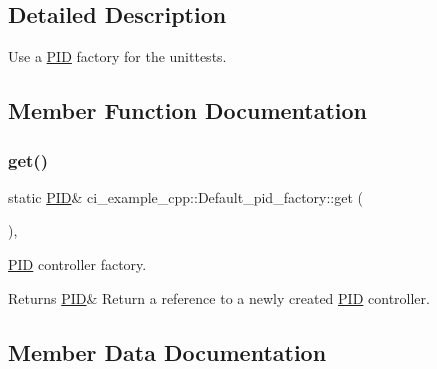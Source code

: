 \subsection{Detailed Description}
Use a \hyperlink{classci__example__cpp_1_1PID}{P\+ID} factory for the unittests. 



\subsection{Member Function Documentation}
\mbox{\label{classci__example__cpp_1_1Default__pid__factory_a5dbbcfbe3e19953b9d0c490ea62fde1a}} 
\subsubsection{\texorpdfstring{get()}{get()}}
{\footnotesize\ttfamily static \hyperlink{classci__example__cpp_1_1PID}{P\+ID}\& ci\+\_\+example\+\_\+cpp\+::\+Default\+\_\+pid\+\_\+factory\+::get (\begin{DoxyParamCaption}{ }\end{DoxyParamCaption})\hspace{0.3cm}{\ttfamily [inline]}, {\ttfamily [static]}}



\hyperlink{classci__example__cpp_1_1PID}{P\+ID} controller factory. 

\begin{DoxyReturn}{Returns}
\hyperlink{classci__example__cpp_1_1PID}{P\+ID}\& Return a reference to a newly created \hyperlink{classci__example__cpp_1_1PID}{P\+ID} controller. 
\end{DoxyReturn}


\subsection{Member Data Documentation}
\mbox{\label{classci__example__cpp_1_1Default__pid__factory_aea273f7df00844476e72b7e6951a493e}} 
